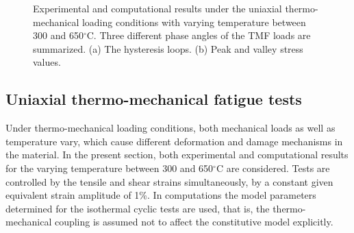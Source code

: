 \documentclass[preprint,5p,twocolumn,11pt,sort&compress]{elsarticle}
\begin{document}


\begin{figure*}
\caption{Experimental and computational results under the uniaxial thermo-mechanical loading conditions with varying temperature between 300 and 650$^{\circ}$C. Three different phase angles of the TMF loads are summarized. (a) The hysteresis loops. (b) Peak and valley stress values.}
\label{Fig:TMF_IP}
\end{figure*}


\subsection{Uniaxial thermo-mechanical fatigue tests}
\noindent
Under thermo-mechanical loading conditions, both mechanical loads as well as temperature vary, which cause different deformation and damage mechanisms in the material.
In the present section, both experimental and computational results for the varying temperature between 300 and 650$^{\circ}$C are considered. Tests are controlled by the tensile and shear strains simultaneously, by a constant given equivalent strain amplitude of 1\%. In computations the model parameters determined for the isothermal cyclic tests are used, that is, the thermo-mechanical coupling is assumed not to affect the constitutive model explicitly.
\end{document}
